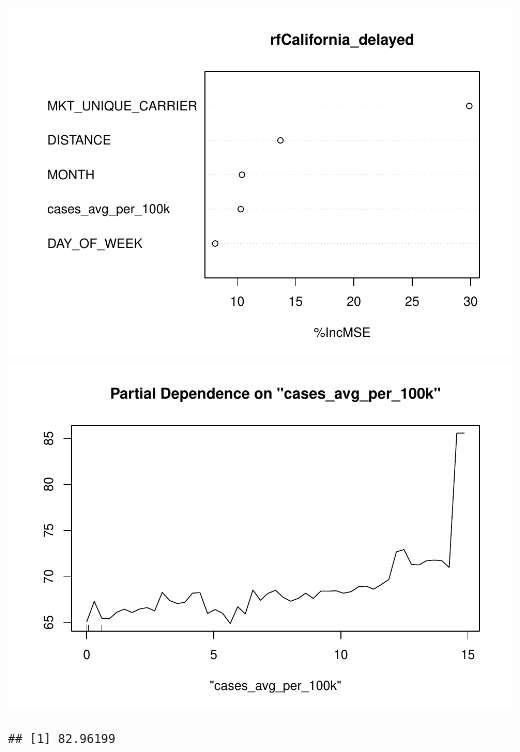 \documentclass[
]{article}
\begin{document}
\includegraphics{final-project_files/figure-latex/rf-delaytime-1.pdf}
\includegraphics{final-project_files/figure-latex/rf-delaytime-2.pdf}

\begin{verbatim}
## [1] 82.96199
\end{verbatim}
\end{document}
